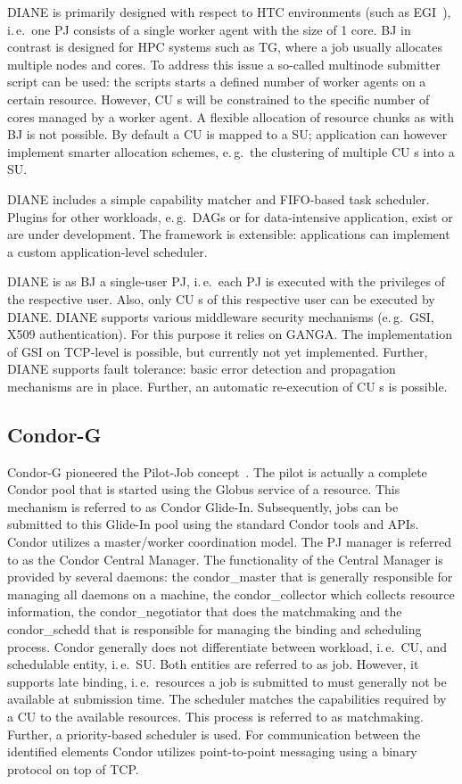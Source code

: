 \documentclass[conference,final]{IEEEtran}
\newcommand{\cu}{CU\xspace}
\newcommand{\upp}{\vspace*{-0.5em}}
\begin{document}
DIANE is primarily designed with respect to HTC environments (such as
EGI~\cite{egi}), i.\,e.\ one PJ consists of a single worker agent with the
size of 1 core. BJ in contrast is designed for HPC systems such as TG,
where a job usually allocates multiple nodes and cores. To address this issue
a so-called multinode submitter script can be used: the scripts starts a
defined number of worker agents on a certain resource. However, \cu s will be
constrained to the specific number of cores managed by a worker agent. A
flexible allocation of resource chunks as with BJ is not possible. By
default a \cu  is mapped to a SU; application can however implement smarter
allocation schemes, e.\,g.\ the clustering of multiple \cu s into a SU.

DIANE includes a simple capability matcher and FIFO-based task scheduler.
Plugins for other workloads, e.\,g.\ DAGs or for data-intensive
application, exist or are under development. The framework is extensible:
applications can implement a custom application-level scheduler.


DIANE is as BJ a single-user PJ, i.\,e.\ each PJ is executed with the
privileges of the respective user. Also, only \cu s of this respective user can be
executed by DIANE. DIANE supports various middleware security mechanisms
(e.\,g.\ GSI, X509 authentication). For this purpose it relies on GANGA. The
implementation of GSI on TCP-level is possible, but currently not yet
implemented. Further, DIANE supports fault tolerance: basic error detection and
propagation mechanisms are in place. Further, an automatic re-execution of \cu s
is possible.

\upp
\subsection{Condor-G\upp\upp}

Condor-G pioneered the Pilot-Job concept~\cite{condor-g}. The pilot is
actually a complete Condor pool that is started using the Globus
service of a resource. This mechanism is referred to as Condor
Glide-In. Subsequently, jobs can be submitted to this Glide-In pool
using the standard Condor tools and APIs. Condor utilizes a
master/worker coordination model. The PJ manager is referred to as the
Condor Central Manager. The functionality of the Central Manager is
provided by several daemons: the condor\_master that is generally
responsible for managing all daemons on a machine, the
condor\_collector which collects resource information, the
condor\_negotiator that does the matchmaking and the condor\_schedd
that is responsible for managing the binding and scheduling
process. Condor generally does not differentiate between workload,
i.\,e.\ \cu, and schedulable entity, i.\,e.\ SU. Both entities are
referred to as job. However, it supports late binding, i.\,e.\
resources a job is submitted to must generally not be available at
submission time. The scheduler matches the capabilities required by a
\cu to the available resources. This process is referred to as
matchmaking. Further, a priority-based scheduler is used. For
communication between the identified elements Condor utilizes
point-to-point messaging using a binary protocol on top of TCP.
\end{document}
